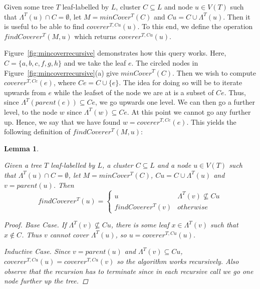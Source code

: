 \documentclass[12pt,a4paper]{article}
\newcommand{\leafset}{\Lambda}
\newtheorem{findcovererrecursive}[incompatibility]{Lemma}
\begin{document}
    Given some tree $T$ leaf-labelled by $L$, cluster $C \subseteq L$ and node $u \in V(T)$ such that $\leafset^{T}(u) \cap C = \emptyset$, let $M = minCover^{T}(C)$ and $Cu = C \cup \leafset^{T}(u)$. Then it is useful to be able to find $coverer^{T, Cu}(u)$. To this end, we define the operation $findCoverer^{T}(M, u)$ which returns $coverer^{T, Cu}(u)$.

    Figure~\ref{fig:mincoverrecursive} demonstrates how this query works. Here, $C = \{a, b, c, f, g, h\}$ and we take the leaf $e$. The circled nodes in Figure~\ref{fig:mincoverrecursive}(a) give $minCover^{T}(C)$. Then we wish to compute $coverer^{T, Ce}(e)$, where $Ce = C \cup \{e\}$. The idea for doing so will be to iterate upwards from $e$ while the leafset of the node we are at is a subset of $Ce$. Thus, since $\leafset^{T}(parent(e)) \subseteq Ce$, we go upwards one level. We can then go a further  level, to the node $w$ since $\leafset^{T}(w) \subseteq Ce$. At this point we cannot go any further up. Hence, we say that we have found $w = coverer^{T, Ce}(e)$. This yields the following definition of $findCoverer^{T}(M, u)$:
    \newline

    \begin{findcovererrecursive}
        \label{lem:findcovererrecursive}

        Given a tree $T$ leaf-labelled by $L$, a cluster $C \subseteq L$ and a node $u \in V(T)$ such that $\leafset^{T}(u) \cap C = \emptyset$, let $M = minCover^{T}(C)$, $Cu = C \cup \leafset^{T}(u)$ and $v = parent(u)$. Then
        \[findCoverer^{T}(u) = \begin{cases}
            u & \leafset^{T}(v) \not\subseteq Cu\\
            findCoverer^{T}(v) & otherwise
        \end{cases}\]

        \begin{proof}
            \textit{Base Case.} If $\leafset^{T}(v) \not\subseteq Cu$, there is some leaf $x \in \leafset^{T}(v)$ such that $x \not\in C$. Thus $v$ cannot cover $\leafset^{T}(u)$, so $u = coverer^{T, Cu}(u)$.

            \textit{Inductive Case.} Since $v = parent(u)$ and $\leafset^{T}(v) \subseteq Cu$, $coverer^{T, Cu}(u) = coverer^{T, Cu}(v)$ so the algorithm works recursively. Also observe that the recursion has to terminate since in each recursive call we go one node further up the tree.
        \end{proof}
    \end{findcovererrecursive}
\end{document}
